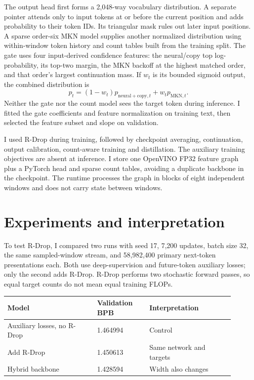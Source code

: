 \documentclass[11pt,a4paper]{article}
\begin{document}
The output head first forms a 2,048-way vocabulary distribution. A separate pointer attends only to input tokens at or before the current position and adds probability to their token IDs. Its triangular mask rules out later input positions. A sparse order-six MKN model supplies another normalized distribution using within-window token history and count tables built from the training split. The gate uses four input-derived confidence features: the neural/copy top log-probability, its top-two margin, the MKN backoff at the highest matched order, and that order's largest continuation mass. If $w_t$ is its bounded sigmoid output, the combined distribution is
\[
p_t=(1-w_t)p_{\mathrm{neural+copy},t}+w_t p_{\mathrm{MKN},t}.
\]
Neither the gate nor the count model sees the target token during inference. I fitted the gate coefficients and feature normalization on training text, then selected the feature subset and slope on validation.

I used R-Drop during training, followed by checkpoint averaging, continuation, output calibration, count-aware training and distillation. The auxiliary training objectives are absent at inference. I store one OpenVINO FP32 feature graph plus a PyTorch head and sparse count tables, avoiding a duplicate backbone in the checkpoint. The runtime processes the graph in blocks of eight independent windows and does not carry state between windows.

\section{Experiments and interpretation}

To test R-Drop, I compared two runs with seed 17, 7,200 updates, batch size 32, the same sampled-window stream, and 58,982,400 primary next-token presentations each. Both use deep-supervision and future-token auxiliary losses; only the second adds R-Drop. R-Drop performs two stochastic forward passes, so equal target counts do not mean equal training FLOPs.

\begin{center}
\begin{tabular}{p{0.36\linewidth}p{0.21\linewidth}p{0.34\linewidth}}
\toprule
Model & Validation BPB & Interpretation \\
\midrule
Auxiliary losses, no R-Drop & 1.464994 & Control \\
Add R-Drop & 1.450613 & Same network and targets \\
Hybrid backbone & 1.428594 & Width also changes \\
\bottomrule
\end{tabular}
\end{center}
\end{document}
